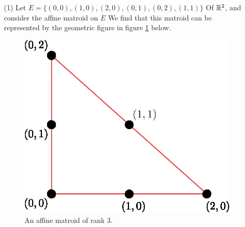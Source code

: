 \begin{example}\label{1.17}
    \begin{enumerate}
        \item[(1)] Let $E=\{(0,0), (1,0), (2,0), (0,1), (0,2), (1,1)\}$ Of $\mathbb{R}^2$,
            and consider the affine matroid on $E$ We find that this matroid can
            be represented by the geometric figure in figure \ref{fig_1.9} below.
            \begin{figure}[h]
                \centering
                \includegraphics[scale=0.8]{Figures/Chapter1/rank_3_affine_matroid.eps}
                \caption{An affine matroid of rank $3$.}
                \label{fig_1.9}
            \end{figure}


\end{enumerate}
\end{example}
